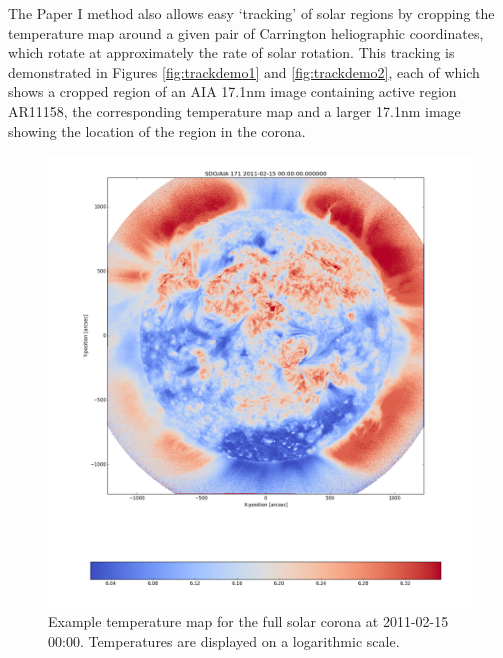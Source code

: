 \documentclass[referee,a4paper,12pt]{swsc}
\begin{document}
\begin{linenumbers}
The Paper I method also allows easy `tracking' of solar regions by cropping the temperature map around a given pair of Carrington heliographic coordinates, which rotate at approximately the rate of solar rotation.
This tracking is demonstrated in Figures \ref{fig:trackdemo1} and \ref{fig:trackdemo2}, each of which shows a cropped region of an AIA 17.1nm image containing active region AR11158, the corresponding temperature map and a larger 17.1nm image showing the location of the region in the corona.

\begin{figure}
	\centering
		\includegraphics[width=\columnwidth]{2011-02-15T00_00_00.png}
	\caption{Example temperature map for the full solar corona at 2011-02-15 00:00. Temperatures are displayed on a logarithmic scale.}
	\label{fig:example_tmap}
\end{figure}


\end{linenumbers}
\end{document}
